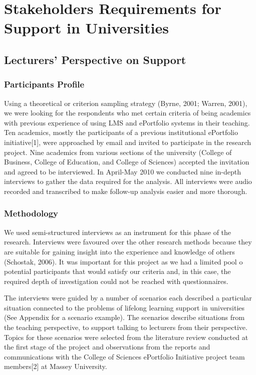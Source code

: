 \chapter{Stakeholders Requirements for \LLLc Support in Universities
\label{cha:model}}

\section{Lecturers' Perspective on \LLLc Support}
\subsection{Participants Profile}
Using a theoretical or criterion sampling strategy (Byrne, 2001; Warren, 2001),
we were looking for the respondents who met certain criteria of being academics
with previous experience of using LMS and ePortfolio systems in their teaching.
Ten academics, mostly the participants of a previous institutional ePortfolio
initiative[1], were approached by email and invited to participate in the
research project. Nine academics from various sections of the university
(College of Business, College of Education, and College of Sciences) accepted
the invitation and agreed to be interviewed. In April-May 2010 we conducted nine
in-depth interviews to gather the data required for the analysis. All interviews
were audio recorded and transcribed to make follow-up analysis easier and more
thorough.
\subsection{Methodology}

We used semi-structured interviews as an instrument for this phase of the
research. Interviews were favoured over the other research methods because they
are suitable for gaining insight into the experience and knowledge of others
(Schostak, 2006). It was important for this project as we had a limited pool o 
potential participants that would satisfy our criteria and, in this case, the
required depth of investigation could not be reached with questionnaires.

The interviews were guided by a number of scenarios each described a particular
situation connected to the problems of lifelong learning support in universities
(See Appendix for a scenario example). The scenarios describe situations from
the teaching perspective, to support talking to lecturers from their
perspective. Topics for these scenarios were selected from the literature review
conducted at the first stage of the project and observations from the reports
and communications with the College of Sciences ePortfolio Initiative project
team members[2] at Massey University.

